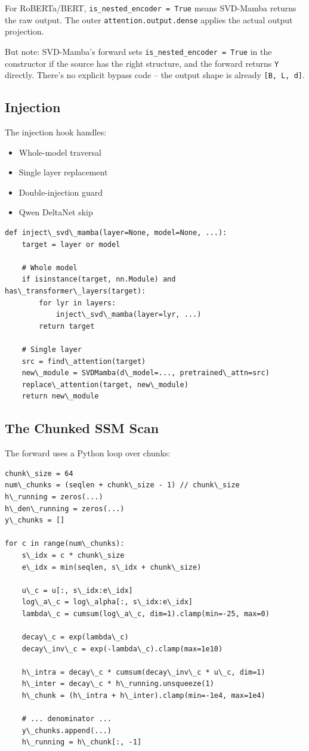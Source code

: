 For RoBERTa/BERT, \texttt{is\_nested\_encoder = True} means SVD-Mamba returns the 
raw output. The outer \texttt{attention.output.dense} applies the actual output 
projection.

But note: SVD-Mamba's forward sets \texttt{is\_nested\_encoder = True} in the 
constructor if the source has the right structure, and the forward 
returns \texttt{Y} directly. There's no explicit bypass code -- the output 
shape is already \texttt{[B, L, d]}.

\subsection{Injection}

The injection hook handles:

\begin{itemize}
\item Whole-model traversal
\item Single layer replacement
\item Double-injection guard
\item Qwen DeltaNet skip

\end{itemize}
\begin{lstlisting}
def inject\_svd\_mamba(layer=None, model=None, ...):
    target = layer or model
    
    # Whole model
    if isinstance(target, nn.Module) and has\_transformer\_layers(target):
        for lyr in layers:
            inject\_svd\_mamba(layer=lyr, ...)
        return target
    
    # Single layer
    src = find\_attention(target)
    new\_module = SVDMamba(d\_model=..., pretrained\_attn=src)
    replace\_attention(target, new\_module)
    return new\_module
\end{lstlisting}

\subsection{The Chunked SSM Scan}

The forward uses a Python loop over chunks:

\begin{lstlisting}
chunk\_size = 64
num\_chunks = (seqlen + chunk\_size - 1) // chunk\_size
h\_running = zeros(...)
h\_den\_running = zeros(...)
y\_chunks = []

for c in range(num\_chunks):
    s\_idx = c * chunk\_size
    e\_idx = min(seqlen, s\_idx + chunk\_size)
    
    u\_c = u[:, s\_idx:e\_idx]
    log\_a\_c = log\_alpha[:, s\_idx:e\_idx]
    lambda\_c = cumsum(log\_a\_c, dim=1).clamp(min=-25, max=0)
    
    decay\_c = exp(lambda\_c)
    decay\_inv\_c = exp(-lambda\_c).clamp(max=1e10)
    
    h\_intra = decay\_c * cumsum(decay\_inv\_c * u\_c, dim=1)
    h\_inter = decay\_c * h\_running.unsqueeze(1)
    h\_chunk = (h\_intra + h\_inter).clamp(min=-1e4, max=1e4)
    
    # ... denominator ...
    y\_chunks.append(...)
    h\_running = h\_chunk[:, -1]
\end{lstlisting}

